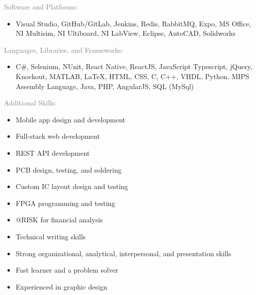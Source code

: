 \documentclass[letterpage]{article}
\begin{document}
\begin{minipage}[t]{0.424\linewidth}
\begin{minipage}[]{0.85\linewidth}
\raggedright
\textcolor{gray}{Software and Platforms:}
\begin{itemize}[label={},leftmargin=*,labelindent=5mm]
\item
Visual Studio,
GitHub/GitLab,
Jenkins,
Redis,
RabbitMQ,
Expo,
MS Office,
NI Multisim,
NI Ultiboard,
NI LabView,
Eclipse,
AutoCAD, 
Solidworks
\end{itemize}
\vspace{7px}
\textcolor{gray}{Languages, Libraries, and Frameworks:}\\
\begin{itemize}[label={},leftmargin=*,labelindent=5mm]
\item
C\#,
Selenium,
NUnit,
React Native,
ReactJS,
JavaScript
Typescript,
jQuery,
Knockout,
MATLAB,
LaTeX,
HTML,
CSS,
C,
C++,
VHDL,
Python,
MIPS Assembly Language,
Java,
PHP,
AngularJS,
SQL (MySql)
\end{itemize}
\vspace{7px}
\textcolor{gray}{Additional Skills:}
\begin{itemize}[leftmargin=*,labelindent=5mm,labelsep=7mm]
\renewcommand\labelitemi{\rule[1mm]{0.33mm}{0.33mm}}
\renewcommand\labelitemii{$\blacksquare$} 
\item
  Mobile app design and development
\item
  Full-stack web development
\item
  REST API development
\item
  PCB design, testing, and soldering
\item
  Custom IC layout design and testing
  \begin{comment}(starting from
  transistor level)\end{comment}
\item
  FPGA programming and testing
\item
  @RISK for financial analysis
\item
  Technical writing skills
\item
  Strong organizational, analytical, interpersonal,
  and presentation skills
\item
  Fast learner and a problem solver
\item
  Experienced in graphic design
\end{itemize}
\end{minipage}

\begin{comment}
\begin{minipage}[]{0.6\linewidth}
\linespread{0.895}\selectfont


\end{comment}
\end{minipage}
\end{document}
